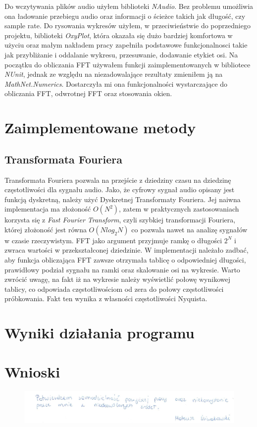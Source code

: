 \documentclass{article}
\begin{document}
Do wczytywania plików audio użyłem biblioteki \textit{NAudio}. Bez problemu umożliwia ona ładowanie przebiegu audio oraz informacji o ścieżce takich jak długość, czy sample rate. Do rysowania wykresów użyłem, w przeciwieństwie do poprzedniego projektu, biblioteki \textit{OxyPlot}, która okazała się dużo bardziej komfortowa w użyciu oraz małym nakładem pracy zapełniła podstawowe funkcjonalnosci takie jak przybliżanie i oddalanie wykresu, przesuwanie, dodawanie etykiet osi. Na początku do obliczania FFT używałem funkcji zaimplementowanych w bibliotece \textit{NUnit}, jednak ze względu na niezadowalające rezultaty zmieniłem ją na \textit{MathNet.Numerics}. Dostarczyła mi ona funkcjonalności wystarczające do obliczania FFT, odwrotnej FFT oraz stosowania okien.

\section{Zaimplementowane metody}
\subsection{Transformata Fouriera}

Transformata Fouriera pozwala na przejście z dziedziny czasu na dziedzinę częstotliwości dla sygnału audio. Jako, że cyfrowy sygnał audio opisany jest funkcją dyskretną, należy użyć Dyskretnej Transformaty Fouriera. Jej naiwna implementacja ma złożoność $O(N^2)$, zatem w praktycznych zastosowaniach korzysta się z \textit{Fast Fourier Transform}, czyli szybkiej transformacji Fouriera, której złożoność jest równa $O(Nlog_2N)$ co pozwala nawet na analizę sygnałów w czasie rzeczywistym. FFT jako argument przyjmuje ramkę o długości $2^N$ i zwraca wartości w przekształconej dziedzinie. W implementacji należało zadbać, aby funkcja obliczająca FFT zawsze otrzymała tablicę o odpowiedniej długości, prawidłowy podział sygnału na ramki oraz skalowanie osi na wykresie. Warto zwrócić uwagę, na fakt iż na wykresie należy wyświetlić połowę wynikowej tablicy, co odpowiada częstotliwościom od zera do połowy częstotliwości próbkowania. Fakt ten wynika z własności częstotliwości Nyquista.

\section{Wyniki działania programu}

\section{Wnioski}

\begin{figure}[b]
\centering
\includegraphics[width=5in]{bottom.png}
\end{figure}
\end{document}
